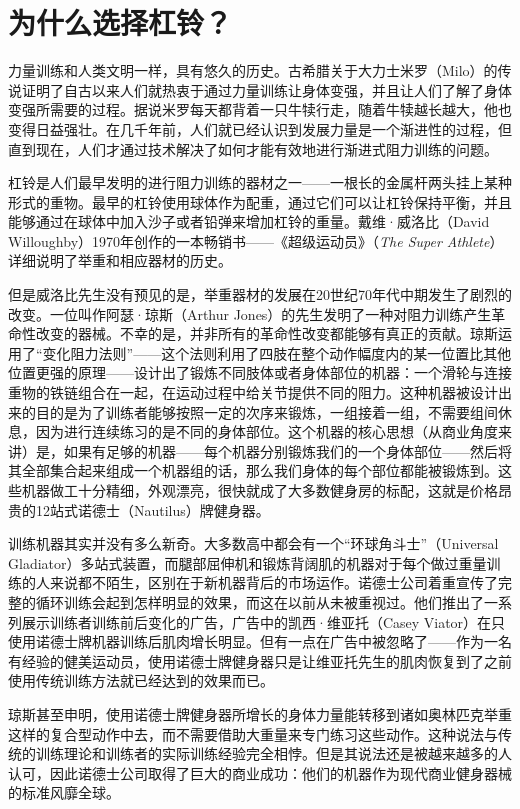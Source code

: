 \section{为什么选择杠铃？}

力量训练和人类文明一样，具有悠久的历史。古希腊关于大力士米罗（Milo）的传说证明了自古以来人们就热衷于通过力量训练让身体变强，并且让人们了解了身体变强所需要的过程。据说米罗每天都背着一只牛犊行走，随着牛犊越长越大，他也变得日益强壮。在几千年前，人们就已经认识到发展力量是一个渐进性的过程，但直到现在，人们才通过技术解决了如何才能有效地进行渐进式阻力训练的问题。

杠铃是人们最早发明的进行阻力训练的器材之一——一根长的金属杆两头挂上某种形式的重物。最早的杠铃使用球体作为配重，通过它们可以让杠铃保持平衡，并且能够通过在球体中加入沙子或者铅弹来增加杠铃的重量。戴维·威洛比（David Willoughby）1970年创作的一本畅销书——《超级运动员》（\textit{The Super Athlete}）详细说明了举重和相应器材的历史。

但是威洛比先生没有预见的是，举重器材的发展在20世纪70年代中期发生了剧烈的改变。一位叫作阿瑟·琼斯（Arthur Jones）的先生发明了一种对阻力训练产生革命性改变的器械。不幸的是，并非所有的革命性改变都能够有真正的贡献。琼斯运用了“变化阻力法则”——这个法则利用了四肢在整个动作幅度内的某一位置比其他位置更强的原理——设计出了锻炼不同肢体或者身体部位的机器：一个滑轮与连接重物的铁链组合在一起，在运动过程中给关节提供不同的阻力。这种机器被设计出来的目的是为了训练者能够按照一定的次序来锻炼，一组接着一组，不需要组间休息，因为进行连续练习的是不同的身体部位。这个机器的核心思想（从商业角度来讲）是，如果有足够的机器——每个机器分别锻炼我们的一个身体部位——然后将其全部集合起来组成一个机器组的话，那么我们身体的每个部位都能被锻炼到。这些机器做工十分精细，外观漂亮，很快就成了大多数健身房的标配，这就是价格昂贵的12站式诺德士（Nautilus）牌健身器。

训练机器其实并没有多么新奇。大多数高中都会有一个“环球角斗士”（Universal Gladiator）多站式装置，而腿部屈伸机和锻炼背阔肌的机器对于每个做过重量训练的人来说都不陌生，区别在于新机器背后的市场运作。诺德士公司着重宣传了完整的循环训练会起到怎样明显的效果，而这在以前从未被重视过。他们推出了一系列展示训练者训练前后变化的广告，广告中的凯西·维亚托（Casey Viator）在只使用诺德士牌机器训练后肌肉增长明显。但有一点在广告中被忽略了——作为一名有经验的健美运动员，使用诺德士牌健身器只是让维亚托先生的肌肉恢复到了之前使用传统训练方法就已经达到的效果而已。

琼斯甚至申明，使用诺德士牌健身器所增长的身体力量能转移到诸如奥林匹克举重这样的复合型动作中去，而不需要借助大重量来专门练习这些动作。这种说法与传统的训练理论和训练者的实际训练经验完全相悖。但是其说法还是被越来越多的人认可，因此诺德士公司取得了巨大的商业成功：他们的机器作为现代商业健身器械的标准风靡全球。

